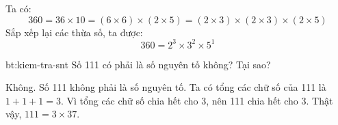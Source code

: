 \begin{loigiai}
Ta có:
\[ 360 = 36 \times 10 = (6 \times 6) \times (2 \times 5) = (2 \times 3) \times (2 \times 3) \times (2 \times 5) \]
Sắp xếp lại các thừa số, ta được:
\[ 360 = 2^3 \times 3^2 \times 5^1 \]
\end{loigiai}


\begin{cauhoi}{bt:kiem-tra-snt}
Số 111 có phải là số nguyên tố không? Tại sao?
\end{cauhoi}

\begin{loigiai}
Không. Số 111 không phải là số nguyên tố.
Ta có tổng các chữ số của 111 là $1+1+1=3$. Vì tổng các chữ số chia hết cho 3, nên 111 chia hết cho 3.
Thật vậy, $111 = 3 \times 37$.
\end{loigiai}